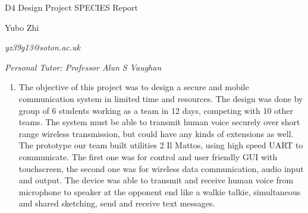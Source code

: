 \documentclass[a4paper,notitlepage,10pt]{report}
\newcommand{\fontTitle}{\fontsize{28pt}{30.8pt}\selectfont}
\newcommand{\fontName}{\fontsize{11pt}{12.1pt}\selectfont}
\newcommand{\fontBody}{\fontsize{10pt}{11pt}\selectfont}
\begin{document}
\parindent=0pt\parskip=0pt
\begin{center}
\fontTitle
D4 Design Project SPECIES Report
\vspace{25pt}

\fontName
Yubo Zhi

\fontBody
\textit{yz39g13@soton.ac.uk}

\fontBody
\textit{Personal Tutor: Professor Alun S Vaughan}
\vspace{25pt}

\end{center}

\fontBody
\begin{enumerate}[label={Abstract:},align=left,leftmargin=2cm,labelwidth=!,topsep=0pt,partopsep=0pt,parsep=0pt,itemsep=0pt]
\item
The objective of this project was to design a secure and mobile communication system in limited time and resources. The design was done by group of 6 students working as a team in 12 days, competing with 10 other teams. The system must be able to transmit human voice securely over short range wireless transmission, but could have any kinds of extensions as well. The prototype our team built utilities 2 Il Mattos, using high speed UART to communicate. The first one was for control and user friendly GUI with touchscreen, the second one was for wireless data communication, audio input and output. The device was able to transmit and receive human voice from microphone to speaker at the opponent end like a walkie talkie, simultaneous and shared sketching, send and receive text messages.
\end{enumerate}
\vspace{25pt}
\end{document}
